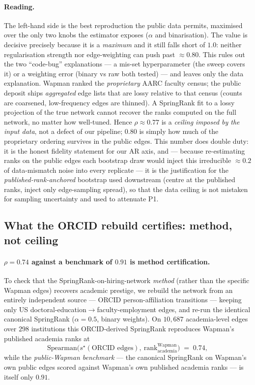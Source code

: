 \documentclass[11pt]{article}
\begin{document}
\paragraph{Reading.} The left-hand side is the best reproduction the public data permits, maximised over the only two knobs the estimator exposes ($\alpha$ and binarisation). The value is decisive precisely because it is a \emph{maximum} and it still falls short of $1.0$: neither regularisation strength nor edge-weighting can push past $\approx 0.80$. This rules out the two ``code-bug'' explanations --- a mis-set hyperparameter (the sweep covers it) or a weighting error (binary vs raw both tested) --- and leaves only the data explanation. Wapman ranked the \emph{proprietary} AARC faculty census; the public deposit ships \emph{aggregated} edge lists that are lossy relative to that census (counts are coarsened, low-frequency edges are thinned). A SpringRank fit to a lossy projection of the true network cannot recover the ranks computed on the full network, no matter how well-tuned. Hence $\rho \approx 0.77$ is a \emph{ceiling imposed by the input data}, not a defect of our pipeline; $0.80$ is simply how much of the proprietary ordering survives in the public edges. This number does double duty: it is the honest fidelity statement for our AR axis, and --- because re-estimating ranks on the public edges each bootstrap draw would inject this irreducible $\approx 0.2$ of data-mismatch noise into every replicate --- it is the justification for the \emph{published-rank-anchored} bootstrap used downstream (centre at the published ranks, inject only edge-sampling spread), so that the data ceiling is not mistaken for sampling uncertainty and used to attenuate P1.

\subsection{What the ORCID rebuild certifies: method, not ceiling}

\paragraph{$\rho = 0.74$ against a benchmark of $0.91$ is method certification.} To check that the SpringRank-on-hiring-network \emph{method} (rather than the specific Wapman edges) recovers academic prestige, we rebuild the network from an entirely independent source --- ORCID person-affiliation transitions --- keeping only US doctoral-education$\to$faculty-employment edges, and re-run the identical canonical SpringRank ($\alpha=0.5$, binary weights). On $10{,}687$ academia-level edges over $298$ institutions this ORCID-derived SpringRank reproduces Wapman's published academia ranks at
\[
\mathrm{Spearman}\bigl(s^\star(\text{ORCID edges}),\ \text{rank}^{\text{Wapman}}_{\text{academia}}\bigr) \;=\; 0.74,
\]
while the \emph{public-Wapman benchmark} --- the canonical SpringRank on Wapman's own public edges scored against Wapman's own published academia ranks --- is itself only $0.91$.
\end{document}
